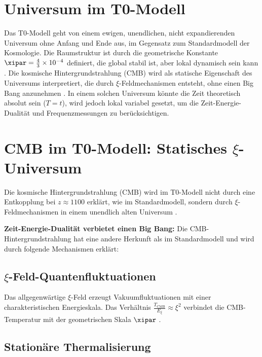 \section{Universum im T0-Modell}
\label{sec:universum}

Das T0-Modell geht von einem ewigen, unendlichen, nicht expandierenden Universum ohne Anfang und Ende aus, im Gegensatz zum Standardmodell der Kosmologie. Die Raumstruktur ist durch die geometrische Konstante \(\xipar = \frac{4}{3} \times 10^{-4}\) definiert, die global stabil ist, aber lokal dynamisch sein kann \cite{pascher_t0_energie_2025}. Die kosmische Hintergrundstrahlung (CMB) wird als statische Eigenschaft des Universums interpretiert, die durch \(\xi\)-Feldmechanismen entsteht, ohne einen Big Bang anzunehmen \cite{pascher_t0_cmb_2025}. In einem solchen Universum könnte die Zeit theoretisch absolut sein (\( T = t \)), wird jedoch lokal variabel gesetzt, um die Zeit-Energie-Dualität und Frequenzmessungen zu berücksichtigen.

\section{CMB im T0-Modell: Statisches \(\xi\)-Universum}
\label{sec:cmb}

Die kosmische Hintergrundstrahlung (CMB) wird im T0-Modell nicht durch eine Entkopplung bei \( z \approx 1100 \) erklärt, wie im Standardmodell, sondern durch \(\xi\)-Feldmechanismen in einem unendlich alten Universum \cite{pascher_t0_cmb_2025}.

\textbf{Zeit-Energie-Dualität verbietet einen Big Bang:} Die CMB-Hintergrundstrahlung hat eine andere Herkunft als im Standardmodell und wird durch folgende Mechanismen erklärt:

\subsection{\(\xi\)-Feld-Quantenfluktuationen}
\label{subsec:xi-fluktuationen}

Das allgegenwärtige \(\xi\)-Feld erzeugt Vakuumfluktuationen mit einer charakteristischen Energieskala. Das Verhältnis \( \frac{T_{\text{CMB}}}{E_\xi} \approx \xi^2 \) verbindet die CMB-Temperatur mit der geometrischen Skala \(\xipar\) \cite{pascher_t0_cmb_2025}.

\subsection{Stationäre Thermalisierung}
\label{subsec:thermalisierung}


